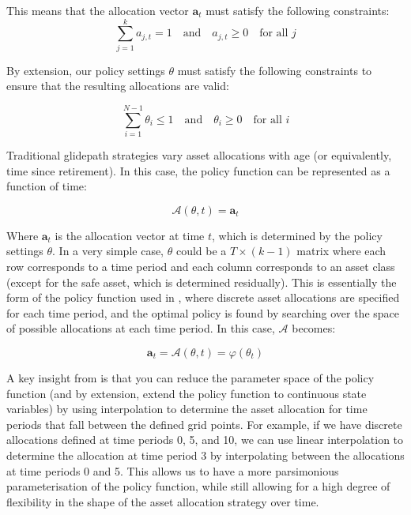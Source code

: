 \documentclass[11pt]{article}
\begin{document}
This means that the allocation vector \(\mathbf{a}_t\) must satisfy the following constraints:
\begin{equation}\label{allocation_constraints}
\sum_{j=1}^{k} a_{j,t} = 1 \quad \text{and} \quad a_{j,t} \geq 0 \quad \text{for all } j
\end{equation}

By extension, our policy settings \(\theta\) must satisfy the following constraints to ensure that the resulting allocations are valid:

\begin{equation}\label{theta_constraints}
  \sum_{i=1}^{N-1} \theta_i \leq 1 \quad \text{and} \quad \theta_i \geq 0 \quad \text{for all } i
\end{equation}


Traditional glidepath strategies vary asset allocations with age (or equivalently, time since retirement). In this case, the policy function can be represented as a function of time:

\begin{equation}\label{time_based_policy}
  \mathcal{A}(\theta, t) = \boldsymbol{a}_t
\end{equation}

Where \(\boldsymbol{a}_t\) is the allocation vector at time \(t\), which is determined by the policy settings \(\theta\). In a very simple case, \(\theta\) could be a \(T \times (k-1)\) matrix where each row corresponds to a time period and each column corresponds to an asset class (except for the safe asset, which is determined residually). This is essentially the form of the policy function used in \textcite{anarkulova2025beyond}, where discrete asset allocations are specified for each time period, and the optimal policy is found by searching over the space of possible allocations at each time period. In this case, \(\mathcal{A}\) becomes:

\begin{equation}\label{discrete_time_allocation}
  \mathbf{a}_t = \mathcal{A}(\theta, t) = \varphi(\theta_t)
\end{equation}


A key insight from \textcite{Makinen2024} is that you can reduce the parameter space of the policy function (and by extension, extend the policy function to continuous state variables) by using interpolation to determine the asset allocation for time periods that fall between the defined grid points. For example, if we have discrete allocations defined at time periods 0, 5, and 10, we can use linear interpolation to determine the allocation at time period 3 by interpolating between the allocations at time periods 0 and 5. This allows us to have a more parsimonious parameterisation of the policy function, while still allowing for a high degree of flexibility in the shape of the asset allocation strategy over time.
\end{document}
